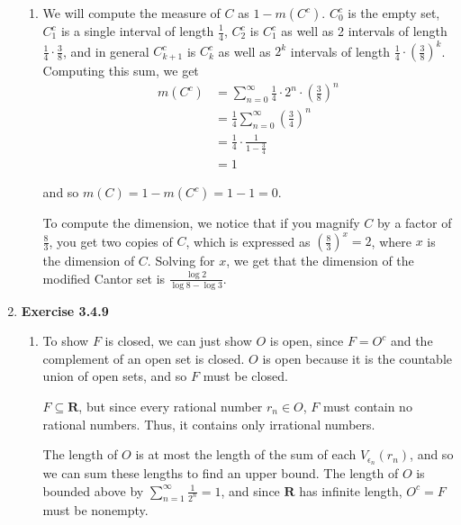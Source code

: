 \documentclass{article}
\begin{document}
\begin{enumerate}
\begin{enumerate}
        \item We will compute the measure of $C$ as $1 - m(C^c)$. $C_0^c$ is the empty set, $C_1^c$ is a single interval of length $\frac{1}{4}$, $C_2^c$ is $C_1^c$ as well as 2 intervals of length $\frac{1}{4} \cdot \frac{3}{8}$, and in general $C_{k+1}^c$ is $C_k^c$ as well as $2^k$ intervals of length $\frac{1}{4} \cdot \left(\frac{3}{8}\right)^k$. Computing this sum, we get \begin{align*}
            m(C^c) &= \sum_{n=0}^\infty \frac{1}{4} \cdot 2^n \cdot \left(\frac{3}{8}\right)^n \\
            &= \frac{1}{4}\sum_{n=0}^\infty \left(\frac{3}{4}\right)^n \\
            &= \frac{1}{4} \cdot \frac{1}{1 - \frac{3}{4}} \\
            &= 1
        \end{align*}

        and so $m(C) = 1 - m(C^c) = 1 - 1 = 0$.

        \smallskip

        To compute the dimension, we notice that if you magnify $C$ by a factor of $\frac{8}{3}$, you get two copies of $C$, which is expressed as $\left(\frac{8}{3}\right)^x = 2$, where $x$ is the dimension of $C$. Solving for $x$, we get that the dimension of the modified Cantor set is $\frac{\log2}{\log8 - \log 3}$.
    \end{enumerate}

    \item \textbf{Exercise 3.4.9}
    \begin{enumerate}
        \item To show $F$ is closed, we can just show $O$ is open, since $F = O^c$ and the complement of an open set is closed. $O$ is open because it is the countable union of open sets, and so $F$ must be closed. 

        \smallskip

        $F \subseteq \mathbf{R}$, but since every rational number $r_n \in O$, $F$ must contain no rational numbers. Thus, it contains only irrational numbers. 

        \smallskip

        The length of $O$ is at most the length of the sum of each $V_{\epsilon_n}(r_n)$, and so we can sum these lengths to find an upper bound. The length of $O$ is bounded above by $\sum_{n=1}^\infty \frac{1}{2^n} = 1$, and since $\mathbf{R}$ has infinite length, $O^c = F$ must be nonempty. 


\end{enumerate}
\end{enumerate}
\end{document}
